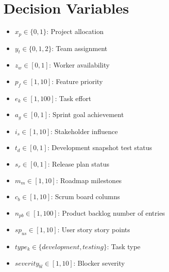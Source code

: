 \documentclass{article}
\begin{document}
\section{Decision Variables}
\begin{itemize}
    \item $x_p \in \{0,1\}$: Project allocation
    \item $y_t \in \{0,1,2\}$: Team assignment
    \item $z_w \in [0,1]$: Worker availability
    \item $p_f \in [1,10]$: Feature priority
    \item $e_k \in [1,100]$: Task effort
    \item $a_g \in [0,1]$: Sprint goal achievement
    \item $i_s \in [1,10]$: Stakeholder influence
    \item $t_d \in [0,1]$: Development snapshot test status
    \item $s_r \in [0,1]$: Release plan status
    \item $m_m \in [1,10]$: Roadmap milestones
    \item $c_b \in [1,10]$: Scrum board columns
    \item $n_{pb} \in [1,100]$: Product backlog number of entries
    \item $sp_{us} \in [1,10]$: User story story points
    \item $type_k \in \{development, testing\}$: Task type
    \item $severity_{bl} \in [1,10]$: Blocker severity
\end{itemize}
\end{document}
